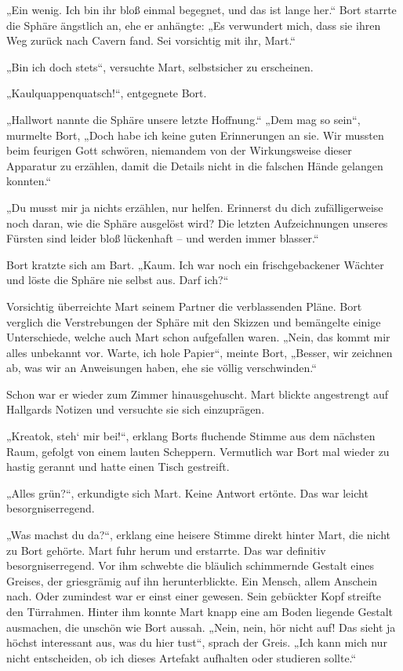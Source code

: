 „Ein wenig. Ich bin ihr bloß einmal begegnet, und das ist lange her.“ Bort starrte die Sphäre ängstlich an, ehe er anhängte: „Es verwundert mich, dass sie ihren Weg zurück nach Cavern fand. Sei vorsichtig mit ihr, Mart.“

„Bin ich doch stets“, versuchte Mart, selbstsicher zu erscheinen.

„Kaulquappenquatsch!“, entgegnete Bort. 

„Hallwort nannte die Sphäre unsere letzte Hoffnung.“ „Dem mag so sein“, murmelte Bort, „Doch habe ich keine guten Erinnerungen an sie. Wir mussten beim feurigen Gott schwören, niemandem von der Wirkungsweise dieser Apparatur zu erzählen, damit die Details nicht in die falschen Hände gelangen konnten.“

„Du musst mir ja nichts erzählen, nur helfen. Erinnerst du dich zufälligerweise noch daran, wie die Sphäre ausgelöst wird? Die letzten Aufzeichnungen unseres Fürsten sind leider bloß lückenhaft – und werden immer blasser.“

Bort kratzte sich am Bart. „Kaum. Ich war noch ein frischgebackener Wächter und löste die Sphäre nie selbst aus. Darf ich?“

Vorsichtig überreichte Mart seinem Partner die verblassenden Pläne. Bort verglich die Verstrebungen der Sphäre mit den Skizzen und bemängelte einige Unterschiede, welche auch Mart schon aufgefallen waren. „Nein, das kommt mir alles unbekannt vor. Warte, ich hole Papier“, meinte Bort, „Besser, wir zeichnen ab, was wir an Anweisungen haben, ehe sie völlig verschwinden.“

Schon war er wieder zum Zimmer hinausgehuscht. Mart blickte angestrengt auf Hallgards Notizen und versuchte sie sich einzuprägen.

„Kreatok, steh‘ mir bei!“, erklang Borts fluchende Stimme aus dem nächsten Raum, gefolgt von einem lauten Scheppern. Vermutlich war Bort mal wieder zu hastig gerannt und hatte einen Tisch gestreift. 

„Alles grün?“, erkundigte sich Mart. Keine Antwort ertönte. Das war leicht besorgniserregend.

„Was machst du da?“, erklang eine heisere Stimme direkt hinter Mart, die nicht zu Bort gehörte. Mart fuhr herum und erstarrte. Das war definitiv besorgniserregend. Vor ihm schwebte die bläulich schimmernde Gestalt eines Greises, der griesgrämig auf ihn herunterblickte. Ein Mensch, allem Anschein nach. Oder zumindest war er einst einer gewesen. Sein gebückter Kopf streifte den Türrahmen. Hinter ihm konnte Mart knapp eine am Boden liegende Gestalt ausmachen, die unschön wie Bort aussah. „Nein, nein, hör nicht auf! Das sieht ja höchst interessant aus, was du hier tust“, sprach der Greis. „Ich kann mich nur nicht entscheiden, ob ich dieses Artefakt aufhalten oder studieren sollte.“ 

